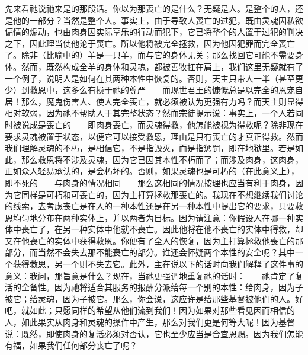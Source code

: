 先来看祂说祂来是的那段话。你以为那喪亡的是什么？无疑是人。是整个的人，还是他的一部分？当然是整个人。事实上，由于导致人喪亡的过犯，既由灵魂因私欲偏情的煽动，也由肉身因实际享乐的行动而犯下，它已将整个的人置于过犯的判决之下，因此理当使他沦于喪亡。所以他将被完全拯救，因为他因犯罪而完全喪亡了。除非（比喻中的）羊是一只羊，而与它的身体无关；那么找回它可能不需要身体。然而，既然构成全羊的身体和灵魂，都被善牧扛在肩上，我们这里无疑就有了一个例子，说明人是如何在其两种本性中恢复的。否则，天主只带人一半（甚至更少）到救恩中，这多么有损于祂的尊严——而现世君王的慷慨总是以完全的恩宠自居！那么，魔鬼伤害人、使人完全喪亡，就必须被认为更强有力吗？而天主则显得相对软弱，因为祂不帮助人于其完整状态？然而宗徒提示说：事实上，一个人若同时被说成是喪亡的——即肉身喪亡，而灵魂得救，他怎能被视为得救呢？除非现在要求灵魂被置于状态，以便它可以接受救恩，理由是只有喪亡的才真正得救。然而我们理解灵魂的不朽，是相信它，不是指毁灭，而是指惩罚，即在地狱里。若是如此，那么救恩将不涉及灵魂，因为它已因其本性不朽而了；而涉及肉身，这肉身，正如众人轻易承认的，是会朽坏的。否则，如果灵魂也是可朽的（在此意义上），即不死的——与肉身的情况相同——那么这相同的情况按理也应当有利于肉身，因为它同样是可朽和可喪亡的，因为主打算拯救那喪亡的。我现在不想继续我们讨论的线索，去考虑丧亡是在人的一种本性还是在另一种本性中提出它的要求，只要救恩均匀地分布在两种实体上，并以两者为目标。因为请注意：你假设人在哪一种实体中喪亡了，在另一种实体中他就不喪亡。因此他将在他不喪亡的实体中得救，却又在他喪亡的实体中获得救恩。你便有了全人的恢复，因为主打算拯救他喪亡的那部分，而当然不会失去那不能喪亡的部分。谁还会怀疑两个本性的安全呢？其中一个获得救恩，另一个则不失去它。此外，主在说以下的话时向我们解释了这件事的意义：我问，那旨意是什么？现在，当祂更强调地重复祂的话时：——祂肯定了复活的全备性。因为祂将适合其服务的报酬分派给每一个别的本性：给肉身，因为子被它；给灵魂，因为子被它。那么，你会说，这应许是给那些基督被他们的人。好吧，就如此；只愿同样的希望从他们流到我们！因为如果对那些看见因而相信的人，如此果实从肉身和灵魂的操作中产生，那么对我们更是何等大呢！因为基督说：既然，即使肉身的复活必须对否认，它也至少应当是合宜恩赐。因为我们怎能有福，如果我们任何部分丧亡了呢？\par

